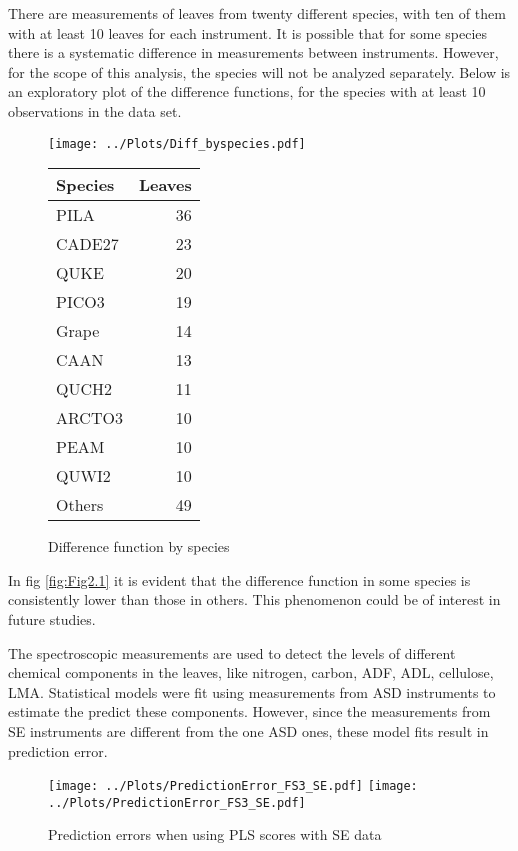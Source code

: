 There are measurements of leaves from twenty different species, with ten of them with at least 10 leaves for each instrument. It is possible that for some species there is a systematic difference in measurements between instruments. However, for the scope of this analysis, the species will not be analyzed separately. Below is an exploratory plot of the difference functions, for the species with at least 10 observations in the data set. 
\begin{figure}[H]
\centering
\begin{minipage}[t]{0.6\textwidth}
\centering
\vspace{0pt}
\texttt{[image: ../Plots/Diff\_byspecies.pdf]}
\caption{Difference function by species}
\end{minipage} \hfill
\begin{minipage}[t]{0.3\textwidth}
\footnotesize
\centering
\vspace{2cm}
\begin{tabular}{lr}
  \hline
  Species & Leaves \\ 
  \hline
  PILA &  36 \\ 
  CADE27 &  23 \\ 
  QUKE &  20 \\ 
  PICO3 &  19 \\ 
  Grape &  14 \\ 
  CAAN &  13 \\ 
  QUCH2 &  11 \\ 
  ARCTO3 &  10 \\ 
  PEAM &  10 \\ 
  QUWI2 &  10 \\ 
  Others &  49 \\ 
  \hline
\end{tabular}
\end{minipage}
\label{fig:Fig2.2}
\end{figure}
In fig \ref{fig:Fig2.1} it is evident that the difference function in some species is consistently lower than those in others. This phenomenon could be of interest in future studies.

The spectroscopic measurements are used to detect the levels of different chemical components in the leaves, like nitrogen, carbon, ADF, ADL, cellulose, LMA. Statistical models were fit using measurements from ASD instruments to estimate the predict these components. However, since the measurements from SE instruments are different from the one ASD ones, these model fits result in prediction error. 

\begin{figure}[H]
\centering
\texttt{[image: ../Plots/PredictionError\_FS3\_SE.pdf]}
\texttt{[image: ../Plots/PredictionError\_FS3\_SE.pdf]}
\caption{Prediction errors when using PLS scores with SE data}
\label{fig:Fig2.3}
\end{figure}

